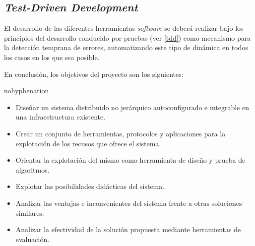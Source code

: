 \subsection{\textit{Test-Driven Development}}

El desarrollo de las diferentes herramientas \textit{software} se deberá realizar bajo los principios del desarrollo conducido por pruebas (ver \ref{tdd}) como mecanismo para la detección temprana de errores, automatizando este tipo de dinámica en todos los casos en los que sea posible.

\vspace{2cm}

En conclusión, los objetivos del proyecto son los siguientes:

\begin{hyphenrules}{nohyphenation}
\begin{center}
\itshape
\begin{itemize}
	\item[] Diseñar un sistema distribuido no jerárquico autoconfigurado e integrable en una infraestructura existente.
	\item[] Crear un conjunto de herramientas, protocolos y aplicaciones para la explotación de los recusos que ofrece el sistema.
	\item[] Orientar la explotación del mismo como herramienta de diseño y prueba de algoritmos.
	\item[] Explotar las posibilidades didácticas del sistema.
	\item[] Analizar las ventajas e inconvenientes del sistema frente a otras soluciones similares.
	\item[] Analizar la efectividad de la solución propuesta mediante herramientas de evaluación.
\end{itemize}
\end{center}
\end{hyphenrules}